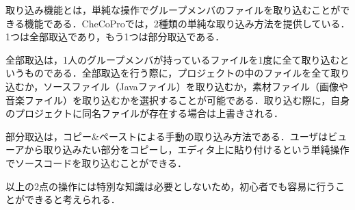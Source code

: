 取り込み機能とは，単純な操作でグループメンバのファイルを取り込むことができる機能である．CheCoProでは，2種類の単純な取り込み方法を提供している．1つは全部取込であり，もう1つは部分取込である．

全部取込は，1人のグループメンバが持っているファイルを1度に全て取り込むというものである．全部取込を行う際に，プロジェクトの中のファイルを全て取り込むか，ソースファイル（Javaファイル）を取り込むか，素材ファイル（画像や音楽ファイル）を取り込むかを選択することが可能である．取り込む際に，自身のプロジェクトに同名ファイルが存在する場合は上書きされる．

部分取込は，コピー\&ペーストによる手動の取り込み方法である．ユーザはビューアから取り込みたい部分をコピーし，エディタ上に貼り付けるという単純操作でソースコードを取り込むことができる．

以上の2点の操作には特別な知識は必要としないため，初心者でも容易に行うことができると考えられる．